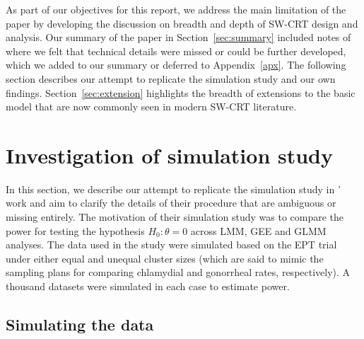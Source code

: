 \documentclass[10pt]{article}
\begin{document}
As part of our objectives for this report, we address the main limitation of the paper by developing the discussion on breadth and depth of SW-CRT design and analysis. Our summary of the paper in Section~\ref{sec:summary} included notes of where we felt that technical details were missed or could be further developed, which we added to our summary or deferred to Appendix~\ref{apx}. The following section describes our attempt to replicate the simulation study and our own findings. Section~\ref{sec:extension} highlights the breadth of extensions to the basic model that are now commonly seen in modern SW-CRT literature.


\section{Investigation of simulation study} \label{sec:simulation}

In this section, we describe our attempt to replicate the simulation study in \textcite{Hussey:2007}' work and aim to clarify the details of their procedure that are ambiguous or missing entirely. The motivation of their simulation study was to compare the power for testing the hypothesis $H_0:\theta=0$ across LMM, GEE and GLMM analyses. The data used in the study were simulated based on the EPT trial under either equal and unequal cluster sizes (which are said to mimic the sampling plans for comparing chlamydial and gonorrheal rates, respectively). A thousand datasets were simulated in each case to estimate power.

\subsection{Simulating the data} \label{sec:sim:data}
\end{document}
